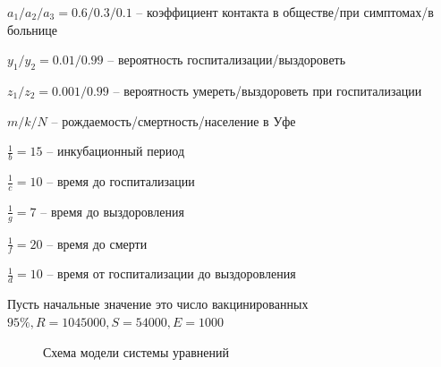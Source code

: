 \documentclass[11pt]{article}
\begin{document}
\begin{enumerate}
		$a_1/a_2/a_3=0.6/0.3/0.1$ -- коэффициент контакта в обществе/при симптомах/в больнице
		
		$y_1/y_2 = 0.01/0.99$ -- вероятность госпитализации/выздороветь
		
		$z_1/z_2 = 0.001/0.99$ -- вероятность умереть/выздороветь при госпитализации
		
		$m/k/N$ -- рождаемость/смертность/население в Уфе
		
		$\frac{1}{b}=15$ -- инкубационный период
		
		$\frac{1}{c}=10$ -- время до госпитализации
		
		$\frac{1}{g}=7$ -- время до выздоровления
		
		$\frac{1}{f}=20$ -- время до смерти
		
		$\frac{1}{d}=10$ -- время от госпитализации до выздоровления
		
		Пусть начальные значение это число вакцинированных $95\%, R=1045000, S=54000, E=1000$ 
		\begin{figure}[h]
			\caption{Схема модели системы уравнений}
			\label{fig:image3}
		\end{figure}
		 

\end{enumerate}
\end{document}
